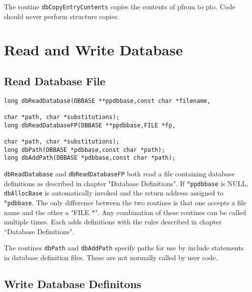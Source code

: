 The routine \verb|dbCopyEntryContents| copies the contents of pfrom to pto. Code should never perform structure copies.

\section{Read and Write Database}

\subsection{Read Database File}

\begin{verbatim}long dbReadDatabase(DBBASE **ppdbbase,const char *filename,

char *path, char *substitutions);
long dbReadDatabaseFP(DBBASE **ppdbbase,FILE *fp,

char *path, char *substitutions);
long dbPath(DBBASE *pdbbase,const char *path);
long dbAddPath(DBBASE *pdbbase,const char *path);

\end{verbatim}
\verb|dbReadDatabase| and \verb|dbReadDatabaseFP| both read a file containing database definitions as described in chapter 
"Database Definitions". If *\verb|ppdbbase| is NULL, \verb|dbAllocBase| is automatically invoked and the return address 
assigned to *\verb|pdbbase|. The only difference between the two routines is that one accepts a file name and the other a 
"FILE *". Any combination of these routines can be called multiple times. Each adds definitions with the rules described 
in chapter ``Database Definitions".

The routines \verb|dbPath| and \verb|dbAddPath| specify paths for use by include statements in database definition files. These are 
not normally called by user code.

\subsection{Write Database Definitons}

